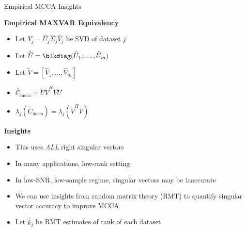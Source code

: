\documentclass[8pt]{beamer}
\begin{document}
\begin{frame}{Empirical MCCA Insights}


  \textbf{Empirical MAXVAR Equivalency}
  \begin{itemize}
  \item Let $Y_j=\widehat{U}_j\widehat{\Sigma}_j\widehat{V}_j$ be SVD of dataset $j$
  \item Let $\widetilde{U}=\blkdiag(\widehat{U}_1,\dots,\widehat{U}_m)$
  \item Let $\widetilde{V}=[\widehat{V}_1,\dots,\widehat{V}_m]$
  \item $\widehat{C}_{\text{mcca}}=
    \widetilde{U}\widetilde{V}^H\widetilde{V}\widetilde{U}$
  \item $\lambda_j\left(\widehat{C}_{\text{mcca}}\right) =
    \lambda_j\left(\widetilde{V}^H\widetilde{V}\right)$ 
  \end{itemize}

  \vspace{3ex}
  \textbf{Insights}
  \begin{itemize}
  \item This uses \textit{ALL} right singular vectors
  \item In many applications, low-rank setting 
  \item In low-SNR, low-sample regime, singular vectors may be inaccurate
  \item We can use insights from random matrix theory (RMT) to quantify singular vector
    accuracy to improve MCCA
  \item Let $\widehat{k}_j$ be RMT estimates of rank of each dataset
  \end{itemize}

\end{frame}
\end{document}

